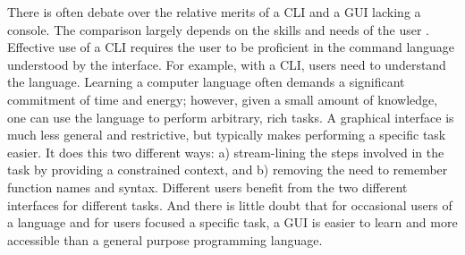 \documentclass[article]{jss}
\begin{document}
There is often debate over the relative merits of a CLI and a GUI
lacking a console. The comparison largely depends on the skills and
needs of the user \citep{gui-cli}. Effective use of a CLI requires the
user to be proficient in the command language understood by the
interface. For example, with a CLI,  users need to understand
the  language. Learning a computer language often demands
a significant commitment of time and energy; however, given a
small amount of knowledge, one can use the language to perform
arbitrary, rich tasks.  A graphical interface is much less general
and restrictive, but typically makes performing a specific task
easier. It does this two different ways: a) stream-lining the steps
involved in the task by providing a constrained context, and b)
removing the need to remember function names and syntax.  Different
users benefit from the two different interfaces for different tasks. 
And there is little doubt that for occasional users of a language and
for users focused a specific task, a GUI is easier to learn and more
accessible than a general purpose programming language.
\end{document}
